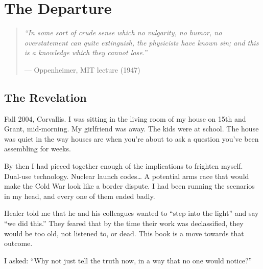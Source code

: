 
\chapter{The Departure}
\label{record:departure}

\begin{quote}\small\textit{%
``In some sort of crude sense which no vulgarity, no humor, no overstatement can quite extinguish, the physicists have known sin; and this is a knowledge which they cannot lose.''%
}\par\raggedleft --- Oppenheimer, MIT lecture (1947)\end{quote}

\vspace{0.5cm}



\section*{The Revelation}
\label{record:dep-the-revelation}


Fall 2004, Corvallis. I was sitting in the living room of my house on 15th and Grant, mid-morning. My girlfriend was away. The kids were at school. The house was quiet in the way houses are when you're about to ask a question you've been assembling for weeks.

By then I had pieced together enough of the implications to frighten myself. Dual-use technology. Nuclear launch codes\ldots{} A potential arms race that would make the Cold War look like a border dispute. I had been running the scenarios in my head, and every one of them ended badly.

Healer told me that he and his colleagues wanted to ``step into the light'' and say ``we did this.'' They feared that by the time their work was declassified, they would be too old, not listened to, or dead. This book is a move towards that outcome.

I asked: ``Why not just tell the truth now, in a way that no one would notice?''

